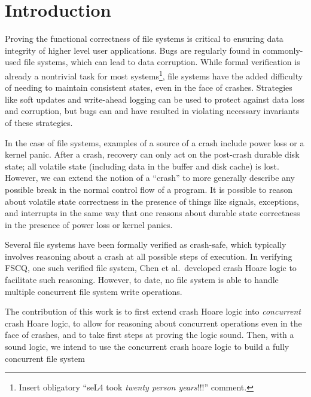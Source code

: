 \begin{abstract}
{\it
{}
}
\end{abstract}

\section{Introduction}
Proving the functional correctness of file systems is critical to ensuring data
integrity of higher level user applications. Bugs are regularly found in
commonly-used file systems, which can lead to data
corruption.\cite{yang2006explode} While formal verification is already a
nontrivial task for most systems\footnote{Insert obligatory ``seL4 took
\textit{twenty person years}!!!'' comment.}, file systems have the added
difficulty of needing to maintain consistent states, even in the face of
crashes. Strategies like soft updates and write-ahead logging can be used to
protect against data loss and corruption, but bugs can and have resulted in
violating necessary invariants of these strategies.

In the case of file systems, examples of a source of a crash include power loss
or a kernel panic. After a crash, recovery can only act on the post-crash
durable disk state; all volatile state (including data in the buffer and disk
cache) is lost. However, we can extend the notion of a ``crash'' to more
generally describe any possible break in the normal control flow of a program.
It is possible to reason about volatile state correctness in the presence of
things like signals, exceptions, and interrupts in the same way that one reasons
about durable state correctness in the presence of power loss or kernel panics.

Several file systems have been formally verified as crash-safe, which typically
involves reasoning about a crash at all possible steps of execution. In
verifying FSCQ, one such verified file system, Chen et al.\ developed crash
Hoare logic to facilitate such reasoning\cite{chen2015using}. However, to date,
no file system is able to handle multiple concurrent file system write
operations.

The contribution of this work is to first extend crash Hoare logic into
\textit{concurrent} crash Hoare logic, to allow for reasoning about concurrent
operations even in the face of crashes, and to take first steps at proving the
logic sound. Then, with a sound logic, we intend to use the concurrent crash
hoare logic to build a fully concurrent file system

